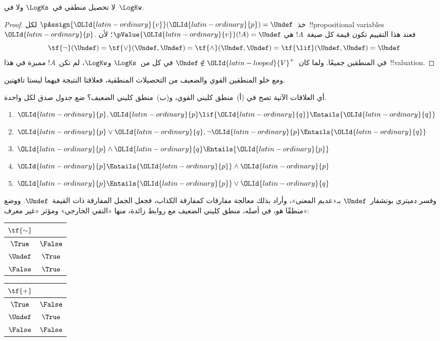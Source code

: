 \documentclass[../../../include/open-logic-section]{subfiles}
\begin{document}
\begin{prop}
  لا تحصيل منطقي في~$\LogKs$ ولا في~$\LogKw$.
\end{prop}

\begin{proof}
  خذ~$\pAssign {\OLId{latin-ordinary}{v}}({\OLId{latin-ordinary}{p}}) = \Undef$ لكل~!!{propositional variable}s~${\OLId{latin-ordinary}{p}}$.
  فعند هذا التقييم تكون قيمة كل صيغة~$!A$ هي
  $\pValue {\OLId{latin-ordinary}{v}}(!A) = \Undef$؛ لأن
  \[
    \tf{\lnot}(\Undef) = \tf{\lor}(\Undef, \Undef) = \tf{\land}(\Undef,
  \Undef) = \tf{\lif}(\Undef, \Undef) = \Undef
  \]
  في المنطقين جميعًا. ولما كان~$\Undef \notin {\OLId{latin-looped}{V}}^+$ في كل من~$\LogKs$
  و$\LogKw$، لم تكن~$!A$ مميزة في هذا~!!{valuation}.
\end{proof}

ومع خلو المنطقين القوي والضعيف من التحصيلات المنطقية، فعلاقتا
النتيجة فيهما ليستا تافهتين.

\begin{prob}
  أي العلاقات الآتية تصح في (أ)~منطق كليني القوي، و(ب)~منطق كليني
  الضعيف؟ ضع جدول صدق لكل واحدة.
  \begin{enumerate}
    \item ${\OLId{latin-ordinary}{p}}, {\OLId{latin-ordinary}{p}} \lif {\OLId{latin-ordinary}{q}} \Entails {\OLId{latin-ordinary}{q}}$
    \item ${\OLId{latin-ordinary}{p}} \lor {\OLId{latin-ordinary}{q}}, \lnot {\OLId{latin-ordinary}{p}} \Entails {\OLId{latin-ordinary}{q}}$
    \item ${\OLId{latin-ordinary}{p}} \land {\OLId{latin-ordinary}{q}} \Entails {\OLId{latin-ordinary}{p}}$
    \item ${\OLId{latin-ordinary}{p}} \Entails {\OLId{latin-ordinary}{p}} \land {\OLId{latin-ordinary}{p}}$
    \item ${\OLId{latin-ordinary}{p}} \Entails {\OLId{latin-ordinary}{p}} \lor {\OLId{latin-ordinary}{q}}$
  \end{enumerate}
\end{prob}

وفسر دميتري بوتشفار~$\Undef$ بـ«عديم المعنى»، وأراد بذلك معالجة
مفارقات كمفارقة الكذاب، فجعل الجمل المفارقة ذات القيمة~$\Undef$.
ووضع منطقًا هو، في أصله، منطق كليني الضعيف مع روابط زائدة، منها
«النفي الخارجي» ومؤثر «غير معرف»:
\begin{center}
  \begin{tabular}{c|c}
    $\tf{\sim}$ & \\
    \hline
    $\True$ & $\False$ \\
    $\Undef$ & $\True$ \\
    $\False$ & $\True$
  \end{tabular}
\quad
  \begin{tabular}{c|c}
    $\tf{+}$ & \\
    \hline
    $\True$ & $\False$ \\
    $\Undef$ & $\True$ \\
    $\False$ & $\False$
  \end{tabular}
\end{center}
\end{document}
